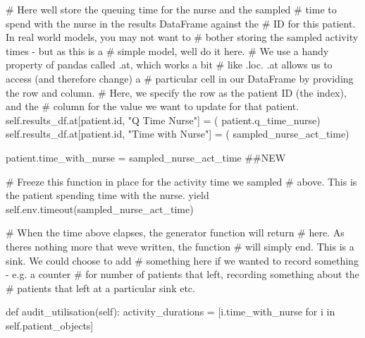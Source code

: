 \documentclass[
  letterpaper,
  DIV=11,
  numbers=noendperiod]{scrreprt}
\newenvironment{Shaded}{}{}
\newcommand{\BuiltInTok}[1]{\textcolor[rgb]{0.84,0.23,0.29}{#1}}
\newcommand{\CommentTok}[1]{\textcolor[rgb]{0.42,0.45,0.49}{#1}}
\newcommand{\ControlFlowTok}[1]{\textcolor[rgb]{0.84,0.23,0.29}{#1}}
\newcommand{\KeywordTok}[1]{\textcolor[rgb]{0.84,0.23,0.29}{#1}}
\newcommand{\NormalTok}[1]{\textcolor[rgb]{0.14,0.16,0.18}{#1}}
\newcommand{\OperatorTok}[1]{\textcolor[rgb]{0.14,0.16,0.18}{#1}}
\newcommand{\StringTok}[1]{\textcolor[rgb]{0.01,0.18,0.38}{#1}}
\newcommand{\VariableTok}[1]{\textcolor[rgb]{0.89,0.38,0.04}{#1}}
\begin{document}
\begin{tcolorbox}
\begin{Shaded}
\begin{Highlighting}[]
            \CommentTok{\# Here we\textquotesingle{}ll store the queuing time for the nurse and the sampled}
            \CommentTok{\# time to spend with the nurse in the results DataFrame against the}
            \CommentTok{\# ID for this patient.  In real world models, you may not want to}
            \CommentTok{\# bother storing the sampled activity times {-} but as this is a}
            \CommentTok{\# simple model, we\textquotesingle{}ll do it here.}
            \CommentTok{\# We use a handy property of pandas called .at, which works a bit}
            \CommentTok{\# like .loc.  .at allows us to access (and therefore change) a}
            \CommentTok{\# particular cell in our DataFrame by providing the row and column.}
            \CommentTok{\# Here, we specify the row as the patient ID (the index), and the}
            \CommentTok{\# column for the value we want to update for that patient.}
            \VariableTok{self}\NormalTok{.results\_df.at[patient.}\BuiltInTok{id}\NormalTok{, }\StringTok{"Q Time Nurse"}\NormalTok{] }\OperatorTok{=}\NormalTok{ (}
\NormalTok{                patient.q\_time\_nurse)}
            \VariableTok{self}\NormalTok{.results\_df.at[patient.}\BuiltInTok{id}\NormalTok{, }\StringTok{"Time with Nurse"}\NormalTok{] }\OperatorTok{=}\NormalTok{ (}
\NormalTok{                sampled\_nurse\_act\_time)}

\NormalTok{            patient.time\_with\_nurse }\OperatorTok{=}\NormalTok{ sampled\_nurse\_act\_time }\CommentTok{\#\#NEW}

            \CommentTok{\# Freeze this function in place for the activity time we sampled}
            \CommentTok{\# above.  This is the patient spending time with the nurse.}
            \ControlFlowTok{yield} \VariableTok{self}\NormalTok{.env.timeout(sampled\_nurse\_act\_time)}

            \CommentTok{\# When the time above elapses, the generator function will return}
            \CommentTok{\# here.  As there\textquotesingle{}s nothing more that we\textquotesingle{}ve written, the function}
            \CommentTok{\# will simply end.  This is a sink.  We could choose to add}
            \CommentTok{\# something here if we wanted to record something {-} e.g. a counter}
            \CommentTok{\# for number of patients that left, recording something about the}
            \CommentTok{\# patients that left at a particular sink etc.}

    \KeywordTok{def}\NormalTok{ audit\_utilisation(}\VariableTok{self}\NormalTok{):}
\NormalTok{        activity\_durations }\OperatorTok{=}\NormalTok{ [i.time\_with\_nurse }\ControlFlowTok{for}\NormalTok{ i }\KeywordTok{in} \VariableTok{self}\NormalTok{.patient\_objects]}


\end{Highlighting}
\end{Shaded}
\end{tcolorbox}
\end{document}
